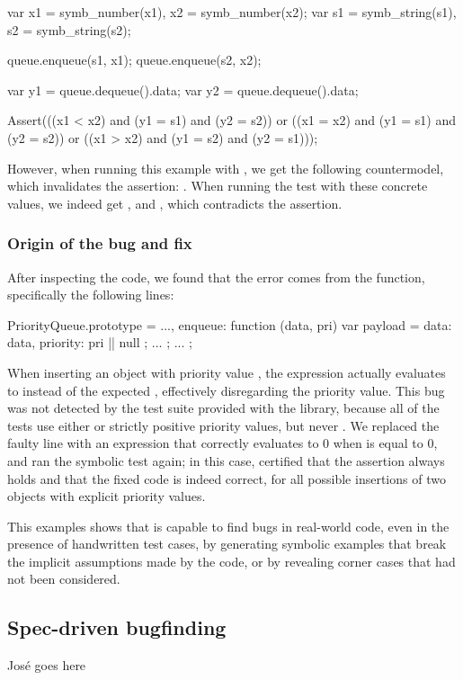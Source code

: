 \begin{lstjs}
var x1 = symb_number(x1), x2 = symb_number(x2);
var s1 = symb_string(s1), s2 = symb_string(s2);

queue.enqueue(s1, x1);
queue.enqueue(s2, x2);

var y1 = queue.dequeue().data;
var y2 = queue.dequeue().data;

Assert(((x1 < x2) and (y1 = s1) and (y2 = s2)) 
    or ((x1 = x2) and (y1 = s1) and (y2 = s2))
    or ((x1 > x2) and (y1 = s2) and (y2 = s1)));
\end{lstjs}


However, when running this example with \cosette, we get the following countermodel, which invalidates the assertion: .
When running the test with these concrete values, we indeed get , and , which contradicts the assertion.

\subsubsection{Origin of the bug and fix}

After inspecting the code, we found that the error comes from the  function, specifically the following lines:

\begin{lstjs}
PriorityQueue.prototype = {
    ...,
    enqueue: function (data, pri) {
        var payload = {
            data: data,
            priority: pri || null
        };
        ...
    };
    ...
};
\end{lstjs}

When inserting an object with priority value , the  expression actually evaluates to  instead of the expected , effectively disregarding the priority value.
This bug was not detected by the test suite provided with the library, because all of the tests use either  or strictly positive priority values, but never .
We replaced the faulty line with an expression that correctly evaluates to 0 when  is equal to 0, and ran the symbolic test again; in this case, \cosette certified that the assertion always holds and that the fixed code is indeed correct, for all possible insertions of two objects with explicit priority values.

This examples shows that \cosette is capable to find bugs in real-world code, even in the presence of handwritten test cases, by generating symbolic examples that break the implicit assumptions made by the code, or by revealing corner cases that had not been considered.


\subsection{Spec-driven bugfinding}

José goes here